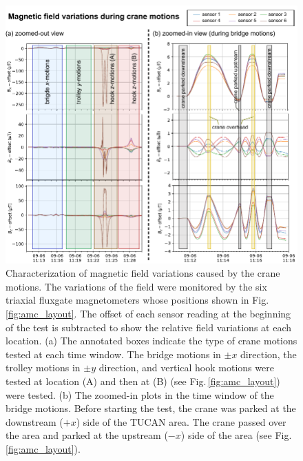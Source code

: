 \begin{figure}[htbp!]
\centering
\includegraphics[width=\textwidth]{graphics/AMC/crane_test.pdf}
\caption{Characterization of magnetic field variations caused by the crane motions. The variations of the field were monitored by the six triaxial fluxgate magnetometers whose positions shown in Fig.\,\ref{fig:amc_layout}. The offset of each sensor reading at the beginning of the test is subtracted to show the relative field variations at each location. 
(a)  The annotated boxes indicate the type of crane motions tested at each time window. The bridge motions in $\pm x$ direction, the trolley motions in $\pm y$ direction, and vertical hook motions were tested at location (A) and then at (B) (see Fig.\,\ref{fig:amc_layout}) were tested. (b) The zoomed-in plots in the time window of the bridge motions. Before starting the test, the crane was parked at the downstream ($+x$) side of the TUCAN area. The crane passed over the area and parked at the upstream ($-x$) side of the area
(see Fig.\,\ref{fig:amc_layout}).
} 
\label{fig:amc_crane}
\end{figure}
